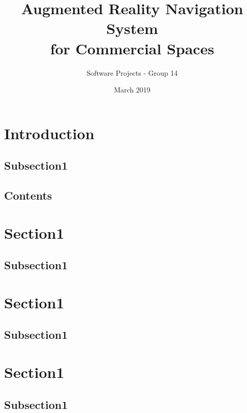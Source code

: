 \documentclass[compress]{beamer}
\title{Augmented Reality Navigation System\\ for Commercial Spaces}
\author{Software Projects - Group 14}
\institute{Goldsmiths, University of London}
\date{March 2019}
\begin{document}
	\section{Introduction}
	\subsection{Subsection1}
	\begin{frame}
		
	\end{frame}

	\subsection{Contents}
	\begin{frame}
	    
	\end{frame}

	\section{Section1}
	\subsection{Subsection1}
	\begin{frame}
	    
	\end{frame}

	\section{Section1}
	\subsection{Subsection1}
	\begin{frame}
	    
	\end{frame}

	\section{Section1}
	\subsection{Subsection1}
	\begin{frame}
	    
	\end{frame}
\end{document}
